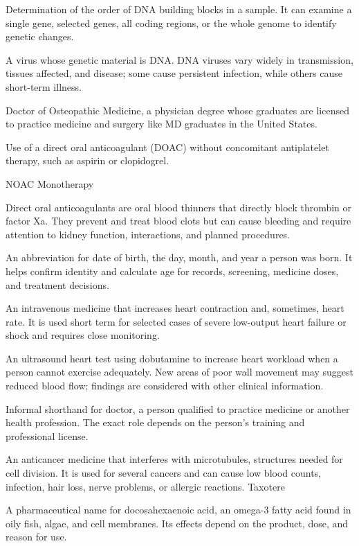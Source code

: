  Determination of the order of DNA building blocks in a sample. It can examine a single gene, selected genes, all coding regions, or the whole genome to identify genetic changes.

 A virus whose genetic material is DNA. DNA viruses vary widely in transmission, tissues affected, and disease; some cause persistent infection, while others cause short-term illness.

 Doctor of Osteopathic Medicine, a physician degree whose graduates are licensed to practice medicine and surgery like MD graduates in the United States.

Use of a direct oral anticoagulant (DOAC) without concomitant antiplatelet therapy, such as aspirin or clopidogrel.

\synonyms
NOAC Monotherapy

 Direct oral anticoagulants are oral blood thinners that directly block thrombin or factor Xa. They prevent and treat blood clots but can cause bleeding and require attention to kidney function, interactions, and planned procedures.

 An abbreviation for date of birth, the day, month, and year a person was born. It helps confirm identity and calculate age for records, screening, medicine doses, and treatment decisions.

 An intravenous medicine that increases heart contraction and, sometimes, heart rate. It is used short term for selected cases of severe low-output heart failure or shock and requires close monitoring.

 An ultrasound heart test using dobutamine to increase heart workload when a person cannot exercise adequately. New areas of poor wall movement may suggest reduced blood flow; findings are considered with other clinical information.

 Informal shorthand for doctor, a person qualified to practice medicine or another health profession. The exact role depends on the person’s training and professional license.

 An anticancer medicine that interferes with microtubules, structures needed for cell division. It is used for several cancers and can cause low blood counts, infection, hair loss, nerve problems, or allergic reactions.
\synonyms
Taxotere

 A pharmaceutical name for docosahexaenoic acid, an omega-3 fatty acid found in oily fish, algae, and cell membranes. Its effects depend on the product, dose, and reason for use.

